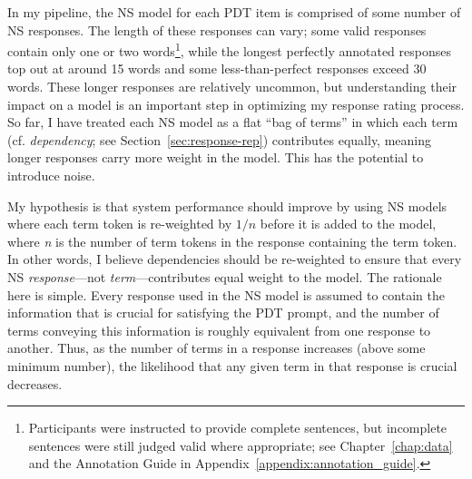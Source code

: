 In my pipeline, the NS model for each PDT item is comprised of some number of NS responses.  The length of these responses can vary; some valid responses contain only one or two words\footnote{Participants were instructed to provide complete sentences, but incomplete sentences were still judged valid where appropriate; see Chapter~\ref{chap:data} and the Annotation Guide in Appendix~\ref{appendix:annotation_guide}.}, while the longest perfectly annotated responses top out at around 15 words and some less-than-perfect responses exceed 30 words. These longer responses are relatively uncommon, but understanding their impact on a model is an important step in optimizing my response rating process. So far, I have treated each NS model as a flat ``bag of terms'' in which each term (cf. \textit{dependency}; see Section~\ref{sec:response-rep}) contributes equally, meaning longer responses carry more weight in the model. This has the potential to introduce noise. 

My hypothesis is that system performance should improve by using NS models where each term token is re-weighted by $1/\textit{n}$ before it is added to the model, where \textit{n} is the number of term tokens in the response containing the term token. In other words, I believe dependencies should be re-weighted to ensure that every NS \textit{response}---not \textit{term}---contributes equal weight to the model. The rationale here is simple. Every response used in the NS model is assumed to contain the information that is crucial for satisfying the PDT prompt, and the number of terms conveying this information is roughly equivalent from one response to another. Thus, as the number of terms in a response increases (above some minimum number), the likelihood that any given term in that response is crucial decreases.


